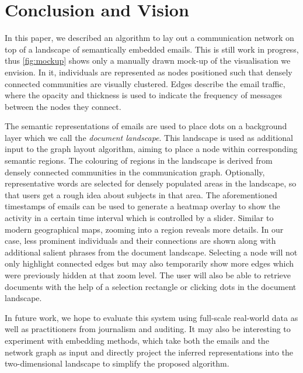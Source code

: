 \section{Conclusion and Vision}

In this paper, we described an algorithm to lay out a communication network on top of a landscape of semantically embedded emails.
This is still work in progress, thus \ref{fig:mockup} shows only a manually drawn mock-up of the visualisation we envision.
In it, individuals are represented as nodes positioned such that densely connected communities are visually clustered.
Edges describe the email traffic, where the opacity and thickness is used to indicate the frequency of messages between the nodes they connect.

The semantic representations of emails are used to place dots on a background layer which we call the \textit{document landscape}.
This landscape is used as additional input to the graph layout algorithm, aiming to place a node within corresponding semantic regions.
The colouring of regions in the landscape is derived from densely connected communities in the communication graph.
Optionally, representative words are selected for densely populated areas in the landscape, so that users get a rough idea about subjects in that area.
The aforementioned timestamps of emails can be used to generate a heatmap overlay to show the activity in a certain time interval which is controlled by a slider.
Similar to modern geographical maps, zooming into a region reveals more details.
In our case, less prominent individuals and their connections are shown along with additional salient phrases from the document landscape.
Selecting a node will not only highlight connected edges but may also temporarily show more edges which were previously hidden at that zoom level.
The user will also be able to retrieve documents with the help of a selection rectangle or clicking dots in the document landscape.

In future work, we hope to evaluate this system using full-scale real-world data as well as practitioners from journalism and auditing.
It may also be interesting to experiment with embedding methods, which take both the emails and the network graph as input and directly project the inferred representations into the two-dimensional landscape to simplify the proposed algorithm.


